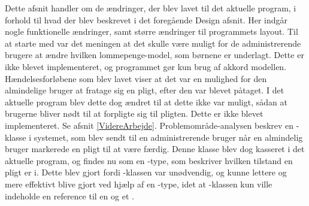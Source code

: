 Dette afsnit handler om de ændringer, der blev lavet til det aktuelle program, i forhold til hvad der blev beskrevet i det foregående Design afsnit. Her indgår nogle funktionelle ændringer, samt større ændringer til programmets layout.
Til at starte med var det meningen at det skulle være muligt for de administrerende brugere at ændre hvilken lommepenge-model, som børnene er underlagt. Dette er ikke blevet implementeret, og programmet gør kun brug af akkord modellen. Hændelsesforløbene som blev lavet viser at det var en mulighed for den almindelige bruger at fratage sig en pligt, efter den var blevet påtaget. I det aktuelle program blev dette dog ændret til at dette ikke var muligt, sådan at brugerne bliver nødt til at forpligte sig til pligten. Dette er ikke blevet implementeret. Se afsnit \ref{VidereArbejde}.
Problemområde-analysen beskrev en -klasse i systemet, som blev sendt til en administrerende bruger når en almindelig bruger markerede en pligt til at være færdig. Denne klasse blev dog kasseret i det aktuelle program, og findes nu som en -type, som beskriver hvilken tilstand en pligt er i. Dette blev gjort fordi -klassen var unødvendig, og kunne lettere og mere effektivt blive gjort ved hjælp af en -type, idet at -klassen kun ville indeholde en reference til en  og et .